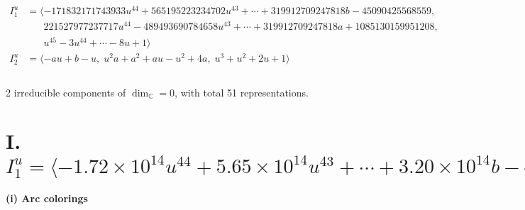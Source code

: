 \documentclass[1p]{elsarticle_modified}
\theoremstyle{definition}
\begin{document}
\begin{align*}
I^u_{1}&=\langle 
-171832171743933 u^{44}+565195223234702 u^{43}+\cdots+319912709247818 b-45090425568559,\\
\phantom{I^u_{1}}&\phantom{= \langle  }221527977237717 u^{44}-489493690784658 u^{43}+\cdots+319912709247818 a+1085130159951208,\\
\phantom{I^u_{1}}&\phantom{= \langle  }u^{45}-3 u^{44}+\cdots-8 u+1\rangle \\
I^u_{2}&=\langle 
- a u+b- u,\;u^2 a+a^2+a u- u^2+4 a,\;u^3+u^2+2 u+1\rangle \\
\\
\end{align*}
\raggedright * 2 irreducible components of $\dim_{\mathbb{C}}=0$, with total 51 representations.\\
\newpage
\renewcommand{\arraystretch}{1}
\centering \section*{I. $I^u_{1}= \langle -1.72\times10^{14} u^{44}+5.65\times10^{14} u^{43}+\cdots+3.20\times10^{14} b-4.51\times10^{13},\;2.22\times10^{14} u^{44}-4.89\times10^{14} u^{43}+\cdots+3.20\times10^{14} a+1.09\times10^{15},\;u^{45}-3 u^{44}+\cdots-8 u+1 \rangle$}
\flushleft \textbf{(i) Arc colorings}\\
\end{document}
